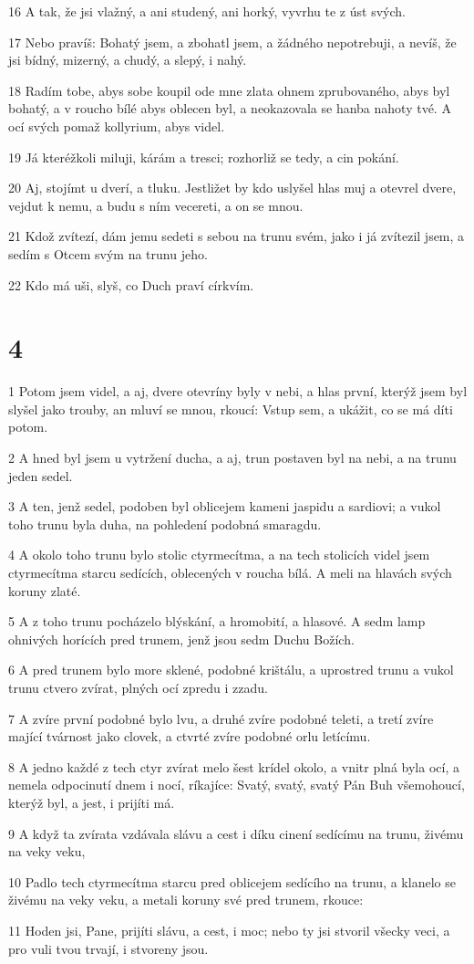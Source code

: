 \par 16 A tak, že jsi vlažný, a ani studený, ani horký, vyvrhu te z úst svých.
\par 17 Nebo pravíš: Bohatý jsem, a zbohatl jsem, a žádného nepotrebuji, a nevíš, že jsi bídný, mizerný, a chudý, a slepý, i nahý.
\par 18 Radím tobe, abys sobe koupil ode mne zlata ohnem zprubovaného, abys byl bohatý, a v roucho bílé abys oblecen byl, a neokazovala se hanba nahoty tvé. A ocí svých pomaž kollyrium, abys videl.
\par 19 Já kteréžkoli miluji, kárám a tresci; rozhorliž se tedy, a cin pokání.
\par 20 Aj, stojímt u dverí, a tluku. Jestližet by kdo uslyšel hlas muj a otevrel dvere, vejdut k nemu, a budu s ním vecereti, a on se mnou.
\par 21 Kdož zvítezí, dám jemu sedeti s sebou na trunu svém, jako i já zvítezil jsem, a sedím s Otcem svým na trunu jeho.
\par 22 Kdo má uši, slyš, co Duch praví církvím.

\chapter{4}

\par 1 Potom jsem videl, a aj, dvere otevríny byly v nebi, a hlas první, kterýž jsem byl slyšel jako trouby, an mluví se mnou, rkoucí: Vstup sem, a ukážit, co se má díti potom.
\par 2 A hned byl jsem u vytržení ducha, a aj, trun postaven byl na nebi, a na trunu jeden sedel.
\par 3 A ten, jenž sedel, podoben byl oblicejem kameni jaspidu a sardiovi; a vukol toho trunu byla duha, na pohledení podobná smaragdu.
\par 4 A okolo toho trunu bylo stolic ctyrmecítma, a na tech stolicích videl jsem ctyrmecítma starcu sedících, oblecených v roucha bílá. A meli na hlavách svých koruny zlaté.
\par 5 A z toho trunu pocházelo blýskání, a hromobití, a hlasové. A sedm lamp ohnivých horících pred trunem, jenž jsou sedm Duchu Božích.
\par 6 A pred trunem bylo more sklené, podobné krištálu, a uprostred trunu a vukol trunu ctvero zvírat, plných ocí zpredu i zzadu.
\par 7 A zvíre první podobné bylo lvu, a druhé zvíre podobné teleti, a tretí zvíre mající tvárnost jako clovek, a ctvrté zvíre podobné orlu letícímu.
\par 8 A jedno každé z tech ctyr zvírat melo šest krídel okolo, a vnitr plná byla ocí, a nemela odpocinutí dnem i nocí, ríkajíce: Svatý, svatý, svatý Pán Buh všemohoucí, kterýž byl, a jest, i prijíti má.
\par 9 A když ta zvírata vzdávala slávu a cest i díku cinení sedícímu na trunu, živému na veky veku,
\par 10 Padlo tech ctyrmecítma starcu pred oblicejem sedícího na trunu, a klanelo se živému na veky veku, a metali koruny své pred trunem, rkouce:
\par 11 Hoden jsi, Pane, prijíti slávu, a cest, i moc; nebo ty jsi stvoril všecky veci, a pro vuli tvou trvají, i stvoreny jsou.

